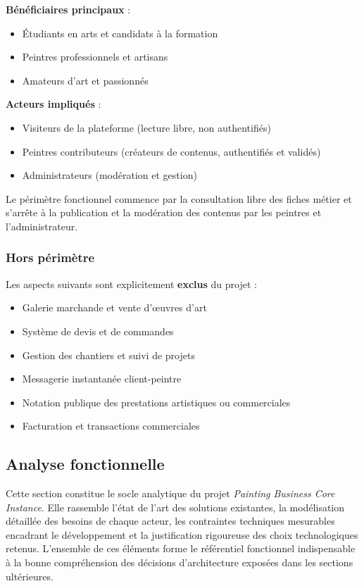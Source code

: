 \documentclass[12pt,a4paper]{report}
\begin{document}
\textbf{Bénéficiaires principaux} :
\begin{itemize}
  \item Étudiants en arts et candidats à la formation
  \item Peintres professionnels et artisans
  \item Amateurs d'art et passionnés
\end{itemize}

\textbf{Acteurs impliqués} :
\begin{itemize}
  \item Visiteurs de la plateforme (lecture libre, non authentifiés)
  \item Peintres contributeurs (créateurs de contenus, authentifiés et validés)
  \item Administrateurs (modération et gestion)
\end{itemize}

Le périmètre fonctionnel commence par la consultation libre des fiches métier et s'arrête à la publication et la modération des contenus par les peintres et l'administrateur.

\subsubsection*{Hors périmètre}

Les aspects suivants sont explicitement \textbf{exclus} du projet :

\begin{itemize}
  \item Galerie marchande et vente d'œuvres d'art
  \item Système de devis et de commandes
  \item Gestion des chantiers et suivi de projets
  \item Messagerie instantanée client-peintre
  \item Notation publique des prestations artistiques ou commerciales
  \item Facturation et transactions commerciales
\end{itemize}

\subsection{Analyse fonctionnelle}
\noindent
Cette section constitue le socle analytique du projet \textit{Painting Business Core Instance}. Elle rassemble l'état de l'art des solutions existantes, la modélisation détaillée des besoins de chaque acteur, les contraintes techniques mesurables encadrant le développement et la justification rigoureuse des choix technologiques retenus. L'ensemble de ces éléments forme le référentiel fonctionnel indispensable à la bonne compréhension des décisions d'architecture exposées dans les sections ultérieures.
\end{document}
